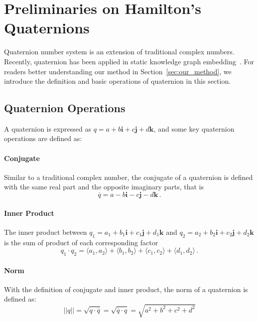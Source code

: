 \documentclass[11pt]{article}
\newcommand{\secref}[1]{Section~\ref{#1}\xspace}
\newcommand{\vect}[1]{\mathbf{#1}\xspace}
\newcommand{\vecti}{\vect{i}\xspace}
\newcommand{\vectj}{\vect{j}\xspace}
\newcommand{\vectk}{\vect{k}\xspace}
\begin{document}
\section{Preliminaries on Hamilton’s Quaternions}
\label{Quaternion}

Quaternion number system \cite{Hamilton1844} is an extension of traditional complex numbers.
Recently, quaternion has been applied in static knowledge graph embedding~\cite{zhang2019quaternion,gao2020rotate3d}.
For readers better understanding our method in \secref{sec:our_method}, we introduce the definition and basic operations of quaternion in this section.


\subsection{Quaternion Operations}
A quaternion is expressed as $q = a + b \vecti +c \vectj +d \vectk$, and some key quaternion operations are defined as:

\paragraph{Conjugate}
Similar to a traditional complex number, the conjugate of a quaternion is defined with the same real part and the opposite imaginary parts, that is $$\overline{q} = a - b \vecti -c \vectj -d \vectk \, . $$

\paragraph{Inner Product}
The inner product between $q_1 = a_1 + b_1 \vecti + c_1 \vectj + d_1 \vectk$ and $q_2 = a_2 + b_2 \vecti + c_2 \vectj + d_2 \vectk$ is the sum of product of each corresponding factor
\begin{equation} \nonumber
q_1 \cdot q_2 =	\langle a_1, a_2 \rangle + \langle b_1, b_2 \rangle + \langle c_1, c_2 \rangle + \langle d_1, d_2 \rangle \, .
\end{equation}

\paragraph{Norm}
With the definition of conjugate and inner product, the norm of a quaternion is defined as:
\begin{equation}\label{equation:norm}
    \vert \vert q \vert \vert = \sqrt{q \cdot \overline{q}} = \sqrt{\overline{q} \cdot q} = \sqrt{a^{2} + b^{2} + c^{2} +d^{2}}
\end{equation}
\end{document}
